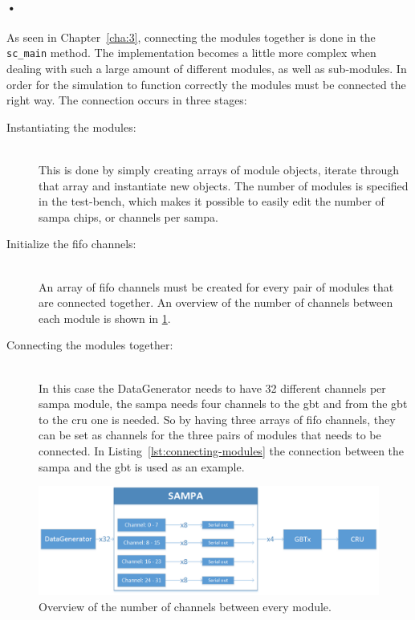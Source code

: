 \documentclass[a4paper, 12pt]{report}
\newcommand{\codeword}[1]{\texttt{#1}}
\begin{document}
\paragraph{•}
As seen in Chapter~\ref{cha:3}, connecting the modules together is done in the \codeword{sc\_main} method.
The implementation becomes a little more complex when dealing with such a large amount of different modules, as well as sub-modules.
In order for the simulation to function correctly the modules must be connected the right way.
The connection occurs in three stages:
\begin{description}
\item[Instantiating the modules:] \hfill \\
This is done by simply creating arrays of module objects, iterate through that array and instantiate new objects.
The number of modules is specified in the test-bench, which makes it possible to easily edit the number of \gls{sampa} chips, or channels per \gls{sampa}.

\item[Initialize the \gls{fifo} channels:] \hfill \\
An array of \gls{fifo} channels must be created for every pair of modules that are connected together.
An overview of the number of channels between each module is shown in \ref{fig:sampa-overview}.
\item[Connecting the modules together:] \hfill \\
In this case the DataGenerator needs to have 32 different channels per \gls{sampa} module, the \gls{sampa} needs four channels to the \gls{gbt} and from the \gls{gbt} to the \gls{cru} one is needed.
So by having three arrays of \gls{fifo} channels, they can be set as channels for the three pairs of modules that needs to be connected.
In Listing~\ref{lst:connecting-modules} the connection between the \gls{sampa} and the \gls{gbt} is used as an example.
\end{description}

\begin{figure}[h!]
	\centering
		\includegraphics[width=1.0\textwidth]{images/sampa-overview.png}
		\caption{Overview of the number of channels between every module.}
		\label{fig:sampa-overview}
\end{figure}
\end{document}
